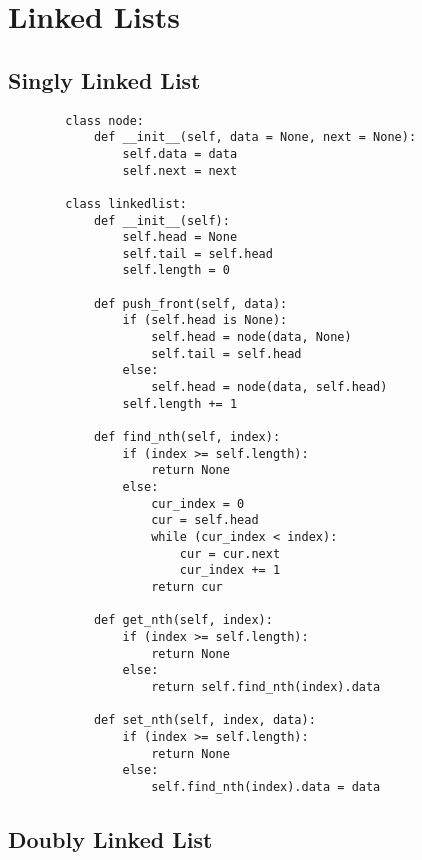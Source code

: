 \newpage

\section[Day 1: Linked List]{ Linked Lists }

\subsection{ Singly Linked List }

    \begin{lstlisting}
        class node:
            def __init__(self, data = None, next = None):
                self.data = data
                self.next = next

        class linkedlist:
            def __init__(self):
                self.head = None
                self.tail = self.head
                self.length = 0
                
            def push_front(self, data):
                if (self.head is None):
                    self.head = node(data, None)
                    self.tail = self.head
                else:
                    self.head = node(data, self.head)
                self.length += 1

            def find_nth(self, index):
                if (index >= self.length):
                    return None
                else:
                    cur_index = 0
                    cur = self.head
                    while (cur_index < index):
                        cur = cur.next
                        cur_index += 1
                    return cur
            
            def get_nth(self, index):
                if (index >= self.length):
                    return None
                else:
                    return self.find_nth(index).data
            
            def set_nth(self, index, data):
                if (index >= self.length):
                    return None
                else:
                    self.find_nth(index).data = data
    \end{lstlisting}

    \newpage




\subsection{ Doubly Linked List }

